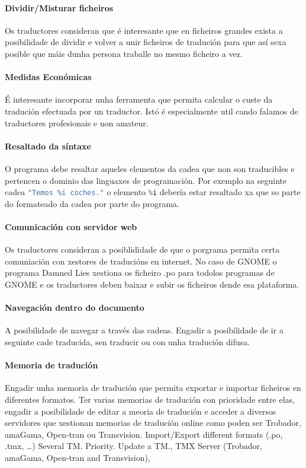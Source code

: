 	\paragraph{Dividir/Misturar ficheiros} Os traductores consideran que é interesante que en ficheiros grandes exista a posibilidade de dividir e volver a unir ficheiros de tradución para que así sexa posible que máis dunha persona traballe no mesmo ficheiro a vez.

	\paragraph{Medidas Económicas} É interesante incorporar unha ferramenta que permita calcular o custe da tradución efectuada por un traductor. Istó é especialmente util cando falamos de traductores profesionais e non amateur.

	\paragraph{Resaltado da síntaxe} O programa debe resaltar aqueles elementos da cadea que non son traducibles e pertencen o dominio das linguaxes de programación. Por exemplo na seguinte cadea \lstinline[language=C]{"Temos %i coches."} o elemento \lstinline[language=C]{%i} debería estar resaltado xa que so parte do formateado da cadea por parte do programa.

	\paragraph{Comunicación con servidor web} Os traductores consideran a posiblididade de que o porgrama permita certa comuniación con xestores de traducións en internet. No caso de GNOME o programa Damned Lies xestiona os ficheiro .po para todolos programas de GNOME e os traductores deben baixar e subir os ficheiros dende esa plataforma.

	\paragraph{Navegación dentro do documento} A posibilidade de navegar a través das cadeas. Engadir a posibilidade de ir a seguinte cade traducida, sen traducir ou con unha tradución difusa.

	\paragraph{Memoria de tradución} Engadir unha memoria de tradución que permita exportar e importar ficheiros en diferentes formatos. Ter varias memorias  de tradución con prioridade entre elas, engadir a posibilidade de editar a meoria de tradución e acceder a diversos servidores que xestionan memorias de tradución online como poden ser Trobador, amaGama, Open-tran ou Transvision. Import/Export different formats (.po, .tmx, …) Several TM. Priority. Update a TM., TMX Server (Trobador, amaGama, Open-tran and Transvision),

